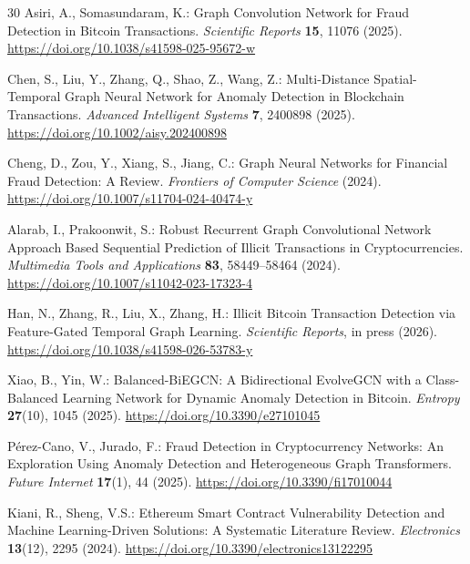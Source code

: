 \documentclass[12pt,a4paper]{article}
\begin{document}
\begin{thebibliography}{30}
  Asiri, A., Somasundaram, K.:
  Graph Convolution Network for Fraud Detection in
  Bitcoin Transactions.
  \textit{Scientific Reports} \textbf{15}, 11076 (2025).
  \url{https://doi.org/10.1038/s41598-025-95672-w}

  Chen, S., Liu, Y., Zhang, Q., Shao, Z., Wang, Z.:
  Multi-Distance Spatial-Temporal Graph Neural Network
  for Anomaly Detection in Blockchain Transactions.
  \textit{Advanced Intelligent Systems} \textbf{7}, 2400898
  (2025).
  \url{https://doi.org/10.1002/aisy.202400898}

  Cheng, D., Zou, Y., Xiang, S., Jiang, C.:
  Graph Neural Networks for Financial Fraud Detection:
  A Review.
  \textit{Frontiers of Computer Science} (2024).
  \url{https://doi.org/10.1007/s11704-024-40474-y}

  Alarab, I., Prakoonwit, S.:
  Robust Recurrent Graph Convolutional Network Approach
  Based Sequential Prediction of Illicit Transactions in
  Cryptocurrencies.
  \textit{Multimedia Tools and Applications} \textbf{83},
  58449--58464 (2024).
  \url{https://doi.org/10.1007/s11042-023-17323-4}

  Han, N., Zhang, R., Liu, X., Zhang, H.:
  Illicit Bitcoin Transaction Detection via Feature-Gated
  Temporal Graph Learning.
  \textit{Scientific Reports}, in press (2026).
  \url{https://doi.org/10.1038/s41598-026-53783-y}

  Xiao, B., Yin, W.:
  Balanced-BiEGCN: A Bidirectional EvolveGCN with a
  Class-Balanced Learning Network for Dynamic Anomaly
  Detection in Bitcoin.
  \textit{Entropy} \textbf{27}(10), 1045 (2025).
  \url{https://doi.org/10.3390/e27101045}

  P\'erez-Cano, V., Jurado, F.:
  Fraud Detection in Cryptocurrency Networks: An
  Exploration Using Anomaly Detection and Heterogeneous
  Graph Transformers.
  \textit{Future Internet} \textbf{17}(1), 44 (2025).
  \url{https://doi.org/10.3390/fi17010044}

  Kiani, R., Sheng, V.S.:
  Ethereum Smart Contract Vulnerability Detection and
  Machine Learning-Driven Solutions: A Systematic
  Literature Review.
  \textit{Electronics} \textbf{13}(12), 2295 (2024).
  \url{https://doi.org/10.3390/electronics13122295}


\end{thebibliography}
\end{document}
